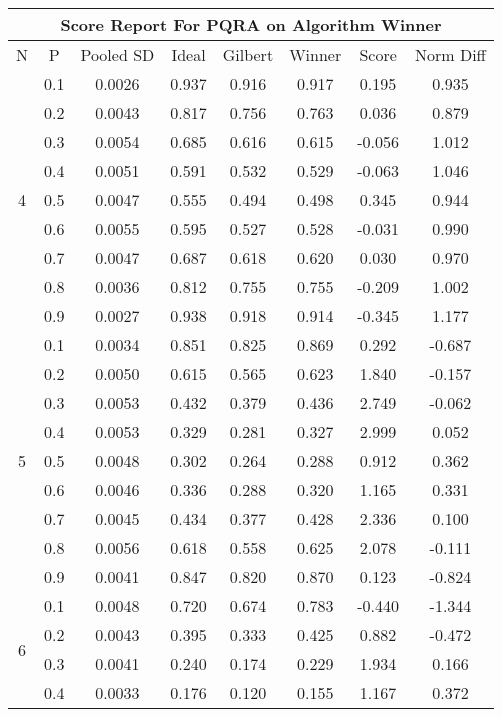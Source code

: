 \documentclass[11pt,a4paper]{report}
\begin{document}
\begin{longtable}{ | c | c || c | c | c | c | c | c | }
\hline
\multicolumn{8}{|c|}{ Score Report For PQRA on Algorithm Winner} \\
\hline
N & P & Pooled SD &  Ideal &  Gilbert & Winner  & Score & Norm Diff \\
 \hline
 \hline
 \endhead
\multirow{9}{*}{4} & 0.1 & 0.0026 & 0.937 & 0.916 & 0.917 & 0.195 & 0.935 \\
 & 0.2 & 0.0043 & 0.817 & 0.756 & 0.763 & 0.036 & 0.879 \\
 & 0.3 & 0.0054 & 0.685 & 0.616 & 0.615 & -0.056 & 1.012 \\
 & 0.4 & 0.0051 & 0.591 & 0.532 & 0.529 & -0.063 & 1.046 \\
 & 0.5 & 0.0047 & 0.555 & 0.494 & 0.498 & 0.345 & 0.944 \\
 & 0.6 & 0.0055 & 0.595 & 0.527 & 0.528 & -0.031 & 0.990 \\
 & 0.7 & 0.0047 & 0.687 & 0.618 & 0.620 & 0.030 & 0.970 \\
 & 0.8 & 0.0036 & 0.812 & 0.755 & 0.755 & -0.209 & 1.002 \\
 & 0.9 & 0.0027 & 0.938 & 0.918 & 0.914 & -0.345 & 1.177 \\
 \hline
\multirow{9}{*}{5} & 0.1 & 0.0034 & 0.851 & 0.825 & 0.869 & 0.292 & -0.687 \\
 & 0.2 & 0.0050 & 0.615 & 0.565 & 0.623 & 1.840 & -0.157 \\
 & 0.3 & 0.0053 & 0.432 & 0.379 & 0.436 & 2.749 & -0.062 \\
 & 0.4 & 0.0053 & 0.329 & 0.281 & 0.327 & 2.999 & 0.052 \\
 & 0.5 & 0.0048 & 0.302 & 0.264 & 0.288 & 0.912 & 0.362 \\
 & 0.6 & 0.0046 & 0.336 & 0.288 & 0.320 & 1.165 & 0.331 \\
 & 0.7 & 0.0045 & 0.434 & 0.377 & 0.428 & 2.336 & 0.100 \\
 & 0.8 & 0.0056 & 0.618 & 0.558 & 0.625 & 2.078 & -0.111 \\
 & 0.9 & 0.0041 & 0.847 & 0.820 & 0.870 & 0.123 & -0.824 \\
 \hline
\multirow{9}{*}{6} & 0.1 & 0.0048 & 0.720 & 0.674 & 0.783 & -0.440 & -1.344 \\
 & 0.2 & 0.0043 & 0.395 & 0.333 & 0.425 & 0.882 & -0.472 \\
 & 0.3 & 0.0041 & 0.240 & 0.174 & 0.229 & 1.934 & 0.166 \\
 & 0.4 & 0.0033 & 0.176 & 0.120 & 0.155 & 1.167 & 0.372 \\

\end{longtable}
\end{document}

